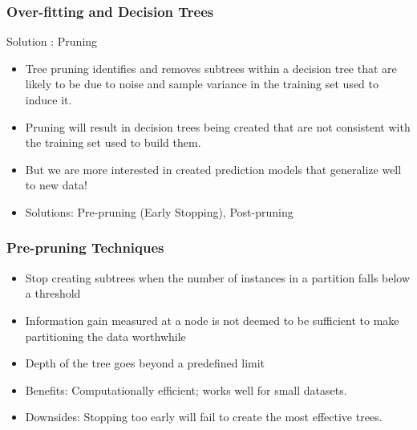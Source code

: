



\begin{frame}[fragile]\frametitle{Over-fitting and Decision Trees}
Solution : Pruning
\begin{itemize}
\item Tree pruning identifies and removes subtrees within a decision tree that are likely to be due to noise and sample variance in the training set used to induce it.
\item Pruning will result in decision trees being created that are not consistent with the training set used to build them.
\item But we are more interested in created prediction models that generalize well to new data! 
\item Solutions: Pre-pruning (Early Stopping), Post-pruning
\end{itemize}
\end{frame}

\begin{frame}[fragile]\frametitle{Pre-pruning Techniques}
\begin{itemize}
\item Stop creating subtrees when the number of instances in a partition falls below a threshold
\item Information gain measured at a node is not deemed to be sufficient to make partitioning the data worthwhile
\item Depth of the tree goes beyond a predefined limit
\item Benefits: Computationally efficient; works well for small datasets.
\item Downsides: Stopping too early will fail to create the most effective trees.
\end{itemize}
\end{frame}

